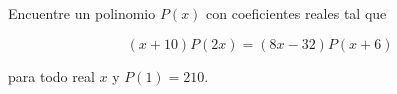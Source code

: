 Encuentre un polinomio $ P\left(x\right)$ con coeficientes reales tal que

$$(x+10)P(2x) = (8x - 32)P(x + 6)$$

para todo real $x$ y $P(1) = 210$.
